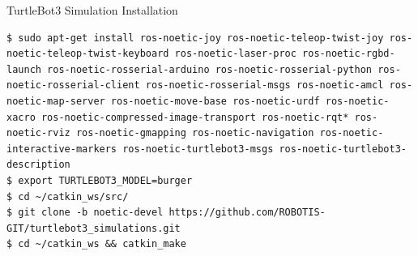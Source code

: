 \begin{frame}[fragile]{TurtleBot3 Simulation Installation}

\begin{lstlisting}[language=shell]
$ sudo apt-get install ros-noetic-joy ros-noetic-teleop-twist-joy ros-noetic-teleop-twist-keyboard ros-noetic-laser-proc ros-noetic-rgbd-launch ros-noetic-rosserial-arduino ros-noetic-rosserial-python ros-noetic-rosserial-client ros-noetic-rosserial-msgs ros-noetic-amcl ros-noetic-map-server ros-noetic-move-base ros-noetic-urdf ros-noetic-xacro ros-noetic-compressed-image-transport ros-noetic-rqt* ros-noetic-rviz ros-noetic-gmapping ros-noetic-navigation ros-noetic-interactive-markers ros-noetic-turtlebot3-msgs ros-noetic-turtlebot3-description
$ export TURTLEBOT3_MODEL=burger
$ cd ~/catkin_ws/src/
$ git clone -b noetic-devel https://github.com/ROBOTIS-GIT/turtlebot3_simulations.git
$ cd ~/catkin_ws && catkin_make
\end{lstlisting}



\end{frame}

